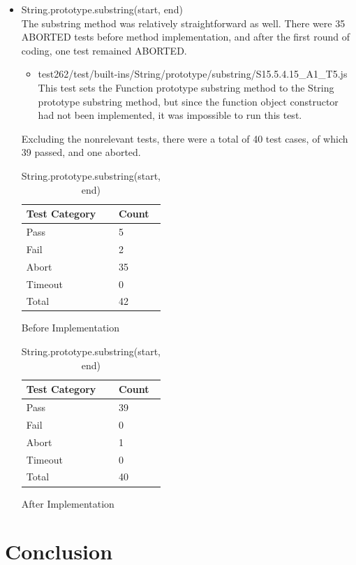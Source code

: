 \documentclass[a4paper,11pt,twoside]{report}
\begin{document}
\begin{itemize}
\item String.prototype.substring(start, end) \\
The substring method was relatively straightforward as well. There were 35 ABORTED tests before method implementation, and after the first round of coding, one test remained ABORTED. 
\begin{itemize}
\item test262/test/built-ins/String/prototype/substring/S15.5.4.15\_A1\_T5.js \\
This test sets the Function prototype substring method to the String prototype substring method, but since the function object constructor had not been implemented, it was impossible to run this test.
\end{itemize}
Excluding the nonrelevant tests, there were a total of 40 test cases, of which 39 passed, and one aborted.
\begin{table}[ht!]
\centering
\begin{subtable}{0.5\textwidth}
\centering
\begin{tabular}{|p{3cm}|p{2cm}|} \hline
\textbf{Test Category} & \textbf{Count} \\ \hline
Pass & 5 \\
Fail & 2 \\
Abort & 35 \\
Timeout & 0 \\
Total & 42 \\ \hline
\end{tabular}
\caption{Before Implementation}
\end{subtable}%
\begin{subtable}{0.5\textwidth}
\centering
\begin{tabular}{|p{3cm}|p{2cm}|} \hline
\textbf{Test Category} & \textbf{Count} \\ \hline
Pass & 39 \\
Fail & 0 \\
Abort & 1 \\
Timeout & 0 \\
Total & 40 \\ \hline
\end{tabular}
\caption{After Implementation}
\end{subtable}
\caption{String.prototype.substring(start, end)}
\end{table}

\end{itemize}

\chapter{Conclusion}
\end{document}

